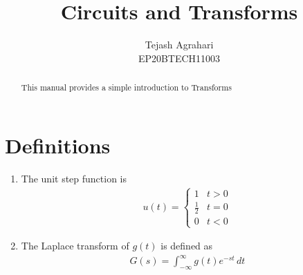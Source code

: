 \documentclass[journal,12pt,twocolumn]{IEEEtran}
\renewcommand\thesection{\arabic{section}}
\begin{document}
\let\StandardTheFigure\thefigure
\renewcommand{\thefigure}{\theproblem}
\renewcommand{\thefigure}{\arabic{section}.\arabic{figure}}
\makeatletter
{}
\makeatother


\def\putbox#1#2#3{\makebox[0in][l]{\makebox[#1][l]{}\raisebox{\baselineskip}[0in][0in]{\raisebox{#2}[0in][0in]{#3}}}}
     \def\rightbox#1{\makebox[0in][r]{#1}}
     \def\centbox#1{\makebox[0in]{#1}}
     \def\topbox#1{\raisebox{-\baselineskip}[0in][0in]{#1}}
     \def\midbox#1{\raisebox{-0.5\baselineskip}[0in][0in]{#1}}

\vspace{3cm}

\title{ 
Circuits and Transforms
}

\author{Tejash Agrahari\\ EP20BTECH11003}

\maketitle


\tableofcontents
       

\renewcommand{\thefigure}{\theenumi}
\renewcommand{\thetable}{\theenumi}



\bigskip

\begin{abstract}
This manual provides a simple introduction to Transforms
\end{abstract}

\section{Definitions}
\begin{enumerate}[label=\arabic*.,ref=\thesection.\theenumi]
\item The unit step function is 
\begin{align}
u(t) =
\begin{cases}
1 & t > 0
\\
	\frac{1}{2} & t = 0
\\
0 & t < 0
\end{cases}
\end{align}
\item The Laplace transform of $g(t)$ is defined as 
\begin{align}
	G(s) = \int_{-\infty}^{\infty} g(t) e^{-st}\, dt
\end{align}
 \end{enumerate}
\end{document}
